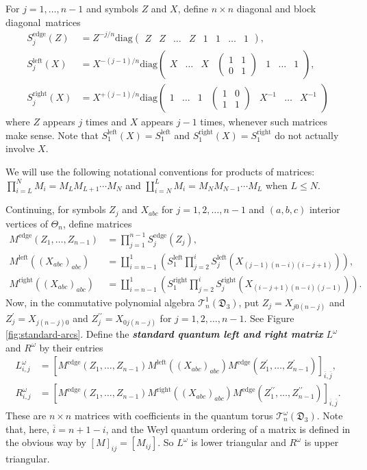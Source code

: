 \documentclass[12pt,
	]{amsart}
\theoremstyle{definition}
\renewcommand{\bar}{\overline}
\newcommand{\mrm}[1]{\mathrm{#1}}
\newcommand{\mcal}[1]{\mathcal{#1}}
\newcommand{\mfrak}[1]{\mathfrak{#1}}
\newcommand{\lp}{\left(}\newcommand{\rp}{\right)}
\newcommand{\define}[1]{{\textit{\textbf{#1}}}}
\newcommand{\bmat}{\lp\begin{smallmatrix}}\newcommand{\emat}{\end{smallmatrix}\rp}
\newcommand{\inv}[1]{#1^{-1}}
\newcommand{\ttriang}{\mfrak{D}_3}
\newcommand{\wroot}{\omega}
\newcommand{\qtorus}[1]{\mcal{T}_n^\wroot(#1)}
\newcommand{\discrete}{\Theta_n}
\newcommand{\cltorus}[1]{\mcal{T}_n^1(#1)}
\newcommand{\elemedgemat}[1]{S^\mrm{edge}_{#1}}
\newcommand{\elemleftmat}[1]{S^\mrm{left}_{#1}}
\newcommand{\elemrightmat}[1]{S^\mrm{right}_{#1}}
\newcommand{\edgemat}{M^\mrm{edge}}
\newcommand{\leftmat}{M^\mrm{left}}
\newcommand{\rightmat}{M^\mrm{right}}
\newcommand{\qleftmat}{L^\wroot}
\newcommand{\qrightmat}{R^\wroot}
\begin{document}
For $j=1,\dots,n-1$ and symbols $Z$ and $X$, define $n\times n$ diagonal and block diagonal~matrices 
\begin{align*}\elemedgemat{j}(Z)&=Z^{-j/n}\mrm{diag}\bmat Z&Z&\hdots&Z&1&1&\hdots&1\emat, \\
\elemleftmat{j}(X)&=X^{-(j-1)/n}\mrm{diag}\bmat X&\hdots&X&\bmat1&1\\0&1\emat&1&\hdots&1\emat,  \\ 
\elemrightmat{j}(X)&=X^{+(j-1)/n}\mrm{diag}\bmat1&\hdots&1&\bmat1&0\\1&1\emat&\inv{X}&\hdots&\inv{X}\emat
\end{align*}
 where $Z$ appears $j$ times and $X$ appears $j-1$ times, whenever such matrices make sense.  Note that $\elemleftmat{1}(X)=\elemleftmat{1}$ and $\elemrightmat{1}(X)=\elemrightmat{1}$ do not actually involve $X$.  

We will use the following notational conventions for products of matrices:  $\prod_{i=L}^N M_i=M_L M_{L+1}\cdots M_N$ and $\coprod_{i=N}^L M_i=M_N M_{N-1}\cdots M_L$ when $L\leq N$.  

Continuing, for symbols $Z_j$ and $X_{abc}$ for $j=1,2,\dots,n-1$ and $(a,b,c)$ interior vertices of $\discrete$, define matrices 
\begin{align*}
\edgemat(Z_1,\dots,Z_{n-1})&=\prod_{j=1}^{n-1}\elemedgemat{j}(Z_j),\\\leftmat((X_{abc})_{abc})&=\coprod_{i=n-1}^1\lp\elemleftmat{1}\prod_{j=2}^i\elemleftmat{j}(X_{(j-1)(n-i)(i-j+1)})\rp, \\
\rightmat((X_{abc})_{abc})&=\coprod_{i=n-1}^1\lp\elemrightmat{1}\prod_{j=2}^i\elemrightmat{j}(X_{(i-j+1)(n-i)(j-1)})\rp.
\end{align*}
Now, in the commutative polynomial algebra $\cltorus{\ttriang}$, put $Z_j=X_{j0(n-j)}$ and $Z^\prime_j=X_{j(n-j)0}$ and $Z^{\prime\prime}_j=X_{0j(n-j)}$ for $j=1,2,\dots,n-1$.  See Figure \ref{fig:standard-arcs}.  Define the \define{standard quantum left and right matrix} $\qleftmat$ and $\qrightmat$ by their entries
\begin{align*}
\qleftmat_{i,j}&=\left[\edgemat(Z_1,\dots,Z_{n-1})\leftmat((X_{abc})_{abc})\edgemat(Z^\prime_1,\dots,Z^\prime_{n-1})\right]_{\bar{i},\bar{j}},\\
\qrightmat_{i,j}&=\left[\edgemat(Z_1,\dots,Z_{n-1})\rightmat((X_{abc})_{abc})\edgemat(Z^{\prime\prime}_1,\dots,Z^{\prime\prime}_{n-1})\right]_{\bar{i},\bar{j}}.
\end{align*}
These are $n\times n$ matrices with coefficients in the quantum torus $\qtorus{\ttriang}$.  Note that, here, $\bar{i}=n+1-i$, and the Weyl quantum ordering of a matrix is defined in the obvious way by $[M]_{ij}=[M_{ij}]$.  So $\qleftmat$ is lower triangular and $\qrightmat$ is upper triangular.  
\end{document}

